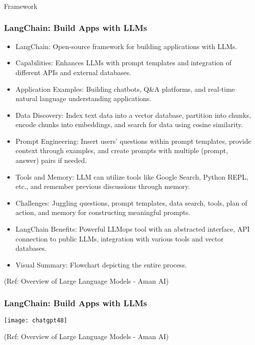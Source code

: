 \begin{frame}[fragile]\frametitle{}
\begin{center}
{\Large Framework}
\end{center}
\end{frame}



\begin{frame}[fragile]\frametitle{LangChain: Build Apps with LLMs}

\begin{itemize}
\item LangChain: Open-source framework for building applications with LLMs.
\item Capabilities: Enhances LLMs with prompt templates and integration of different APIs and external databases.
\item Application Examples: Building chatbots, Q\&A platforms, and real-time natural language understanding applications.
\item Data Discovery: Index text data into a vector database, partition into chunks, encode chunks into embeddings, and search for data using cosine similarity.
\item Prompt Engineering: Insert users' questions within prompt templates, provide context through examples, and create prompts with multiple (prompt, answer) pairs if needed.
\item Tools and Memory: LLM can utilize tools like Google Search, Python REPL, etc., and remember previous discussions through memory.
\item Challenges: Juggling questions, prompt templates, data search, tools, plan of action, and memory for constructing meaningful prompts.
\item LangChain Benefits: Powerful LLMops tool with an abstracted interface, API connection to public LLMs, integration with various tools and vector databases.
\item Visual Summary: Flowchart depicting the entire process.
\end{itemize}

{\tiny (Ref: Overview of Large Language Models - Aman AI)}

\end{frame}

\begin{frame}[fragile]\frametitle{LangChain: Build Apps with LLMs}

		\begin{center}
		\texttt{[image: chatgpt48]}
		\end{center}
		
{\tiny (Ref: Overview of Large Language Models - Aman AI)}

\end{frame}


